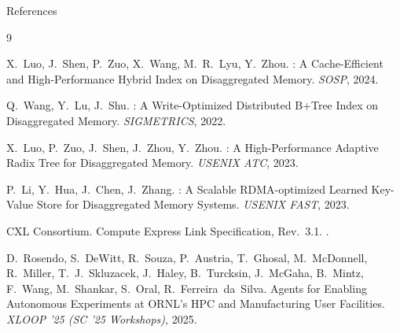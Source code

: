 \begin{frame}[allowframebreaks]{References}
\begin{thebibliography}{9}
\footnotesize

X.~Luo, J.~Shen, P.~Zuo, X.~Wang, M.~R.~Lyu, Y.~Zhou.
: A Cache-Efficient and High-Performance Hybrid Index on Disaggregated Memory.
\newblock \emph{SOSP}, 2024.

Q.~Wang, Y.~Lu, J.~Shu.
: A Write-Optimized Distributed {B+Tree} Index on Disaggregated Memory.
\newblock \emph{SIGMETRICS}, 2022.

X.~Luo, P.~Zuo, J.~Shen, J.~Zhou, Y.~Zhou.
: A High-Performance Adaptive Radix Tree for Disaggregated Memory.
\newblock \emph{USENIX ATC}, 2023.

P.~Li, Y.~Hua, J.~Chen, J.~Zhang.
: A Scalable {RDMA}-optimized Learned Key-Value Store for Disaggregated Memory Systems.
\newblock \emph{USENIX FAST}, 2023.

CXL Consortium.
\newblock Compute Express Link Specification, Rev.~3.1.
.

D.~Rosendo, S.~DeWitt, R.~Souza, P.~Austria, T.~Ghosal, M.~McDonnell,
R.~Miller, T.~J.~Skluzacek, J.~Haley, B.~Turcksin, J.~McGaha, B.~Mintz,
F.~Wang, M.~Shankar, S.~Oral, R.~Ferreira~da~Silva.
 Agents for Enabling Autonomous Experiments at {ORNL}'s {HPC}
and Manufacturing User Facilities.
\newblock \emph{XLOOP '25 (SC '25 Workshops)}, 2025.

\end{thebibliography}
\end{frame}

